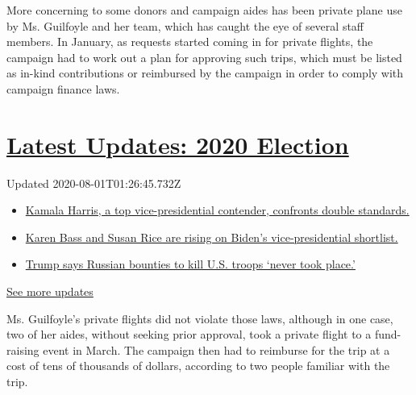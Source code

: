 More concerning to some donors and campaign aides has been private plane
use by Ms. Guilfoyle and her team, which has caught the eye of several
staff members. In January, as requests started coming in for private
flights, the campaign had to work out a plan for approving such trips,
which must be listed as in-kind contributions or reimbursed by the
campaign in order to comply with campaign finance laws.

\hypertarget{latest-updates-2020-election}{%
\section{\texorpdfstring{\href{https://www.nytimes.com/2020/07/31/us/elections/biden-vs-trump.html?action=click\&pgtype=Article\&state=default\&region=MAIN_CONTENT_1\&context=storylines_live_updates}{Latest
Updates: 2020
Election}}{Latest Updates: 2020 Election}}\label{latest-updates-2020-election}}

Updated 2020-08-01T01:26:45.732Z

\begin{itemize}
\tightlist
\item
  \href{https://www.nytimes.com/2020/07/31/us/elections/biden-vs-trump.html?action=click\&pgtype=Article\&state=default\&region=MAIN_CONTENT_1\&context=storylines_live_updates\#link-29fdff45}{Kamala
  Harris, a top vice-presidential contender, confronts double
  standards.}
\item
  \href{https://www.nytimes.com/2020/07/31/us/elections/biden-vs-trump.html?action=click\&pgtype=Article\&state=default\&region=MAIN_CONTENT_1\&context=storylines_live_updates\#link-13ec3d9c}{Karen
  Bass and Susan Rice are rising on Biden's vice-presidential
  shortlist.}
\item
  \href{https://www.nytimes.com/2020/07/31/us/elections/biden-vs-trump.html?action=click\&pgtype=Article\&state=default\&region=MAIN_CONTENT_1\&context=storylines_live_updates\#link-49e9a016}{Trump
  says Russian bounties to kill U.S. troops `never took place.'}
\end{itemize}

\href{https://www.nytimes.com/2020/07/31/us/elections/biden-vs-trump.html?action=click\&pgtype=Article\&state=default\&region=MAIN_CONTENT_1\&context=storylines_live_updates}{See
more updates}

Ms. Guilfoyle's private flights did not violate those laws, although in
one case, two of her aides, without seeking prior approval, took a
private flight to a fund-raising event in March. The campaign then had
to reimburse for the trip at a cost of tens of thousands of dollars,
according to two people familiar with the trip.

